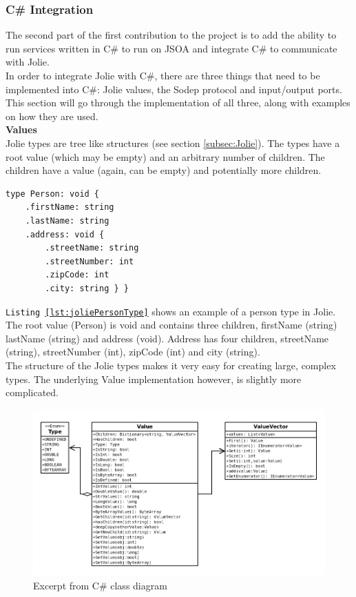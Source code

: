 \documentclass[12pt,a4paper]{article}
\begin{document}
\subsubsection{C\# Integration}\label{subsec:CSharpIntegration}
The second part of the first contribution to the project is to add the ability to run services written in C\# to run on JSOA and integrate C\# to communicate with Jolie. \\
In order to integrate Jolie with C\#, there are three things that need to be implemented into C\#: Jolie values, the Sodep protocol and input/output ports. This section will go through the implementation of all three, along with examples on how they are used.\\

\textbf{Values} \\
Jolie types are tree like structures (see section \ref{subsec:Jolie}). The types have a root value (which may be empty) and an arbitrary number of children. The children have a value (again, can be empty) and potentially more children. 
\begin{lstlisting}[caption={Jolie type},label={lst:joliePersonType}]
type Person: void {
	.firstName: string
	.lastName: string
	.address: void {
		.streetName: string
		.streetNumber: int
		.zipCode: int
		.city: string } }
\end{lstlisting}
\texttt{Listing \ref{lst:joliePersonType}} shows an example of a person type in Jolie. \\
The root value (Person) is void and contains three children, firstName (string) lastName (string) and address (void). Address has four children, streetName (string), streetNumber (int), zipCode (int) and city (string). \\
The structure of the Jolie types makes it very easy for creating large, complex types. The underlying Value implementation however, is slightly more complicated.\\

\begin{figure}[h!]
  \centering
    \includegraphics[width=1.0\textwidth]{../figures/cSharpClassDiagram.png}
  \caption{Excerpt from C\# class diagram}
  \label{fig:cSharpClassDiagram}
\end{figure}
\end{document}
